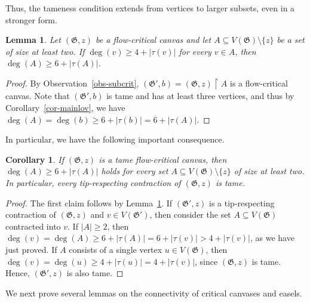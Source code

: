 \documentclass{article}
\newcommand\g{\mathfrak{G}}
\newtheorem{corollary}[theorem]{Corollary}
\newtheorem{lemma}[theorem]{Lemma}
\begin{document}
Thus, the tameness condition extends from vertices to larger subsets, even in a stronger form.

\begin{lemma}\label{lemma-cut}
Let $(\g,z)$ be a flow-critical canvas and let $A\subseteq V(\g)\setminus\{z\}$ be a set of size at least two.
If $\deg(v)\ge 4+|\tau(v)|$ for every $v\in A$, then $\deg(A) \ge 6+|\tau(A)|$.
\end{lemma}
\begin{proof}
By Observation~\ref{obs-subcrit}, $(\g',b)=(\g,z)\restriction A$ is a flow-critical canvas.  Note that $(\g',b)$ is tame and has at least three vertices,
and thus by Corollary~\ref{cor-mainlov}, we have $\deg(A)= \deg(b) \ge 6+|\tau(b)|=6+|\tau(A)|$.  
\end{proof}

In particular, we have the following important consequence.

\begin{corollary}\label{cor-contrtame}
If $(\g,z)$ is a tame flow-critical canvas, then $\deg(A)\ge 6+|\tau(A)|$ holds for every set $A\subseteq V(\g)\setminus \{z\}$
of size at least two.  In particular, every tip-respecting contraction of $(\g,z)$ is tame.
\end{corollary}
\begin{proof}
The first claim follows by Lemma~\ref{lemma-cut}.
If $(\g',z)$ is a tip-respecting contraction of $(\g,z)$ and $v\in V(\g')$, then consider the set $A\subseteq V(\g)$ contracted
into $v$.  If $|A|\ge 2$, then $\deg(v)=\deg(A) \ge 6+|\tau(A)|=6+|\tau(v)|>4+|\tau(v)|$, as we have just proved.
If $A$ consists of a single vertex $u\in V(\g)$, then $\deg(v)=\deg(u)\ge 4+|\tau(u)|=4+|\tau(v)|$, since $(\g,z)$ is
tame.  Hence, $(\g',z)$ is also tame.
\end{proof}

 
We next prove several lemmas on the connectivity of critical canvases and easels.
\end{document}
